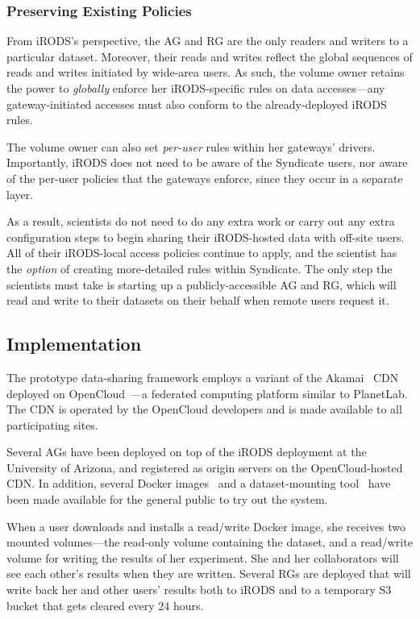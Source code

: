 \subsubsection{Preserving Existing Policies}

From iRODS's perspective, the AG and RG are the only readers and writers to a
particular dataset.  Moreover, their reads and writes reflect the global
sequences of reads and writes initiated by wide-area users.  As such, the
volume owner retains the power to \emph{globally} enforce her iRODS-specific rules on data
accesses---any gateway-initiated accesses must also conform to the
already-deployed iRODS rules.

The volume owner can also set \emph{per-user} rules within her
gateways' drivers.  Importantly, iRODS does not need to be aware of the
Syndicate users, nor aware of the per-user policies that the gateways enforce,
since they occur in a separate layer.

As a result, scientists do not need to do any extra work or carry out any extra
configuration steps to begin sharing their iRODS-hosted data with off-site users.
All of their iRODS-local access policies continue to apply, and the scientist
has the \emph{option} of creating more-detailed rules within Syndicate.  The
only step the scientists must take is starting up a publicly-accessible AG and
RG, which will read and write to their datasets on their behalf when remote
users request it.

\subsection{Implementation}

The prototype data-sharing framework employs a variant of the
Akamai~\cite{akamai} CDN deployed on
OpenCloud~\cite{opencloud}---a federated computing platform similar to PlanetLab.
The CDN is operated by the OpenCloud developers and is made available to all
participating sites.

Several AGs have been deployed on top of the iRODS deployment at the University of
Arizona, and registered as origin servers on the OpenCloud-hosted CDN.  In
addition, several Docker images~\cite{syndicate-website} and a dataset-mounting
tool~\cite{sdm} have been made 
available for the general public to try out the system.

When a user downloads and installs a read/write Docker image, she receives two
mounted volumes---the read-only volume containing the dataset, and a read/write
volume for writing the results of her experiment.  She and her collaborators
will see each other's results when they are written.  Several RGs are deployed
that will write back her and other users' results both to iRODS and to a temporary S3
bucket that gets cleared every 24 hours.

